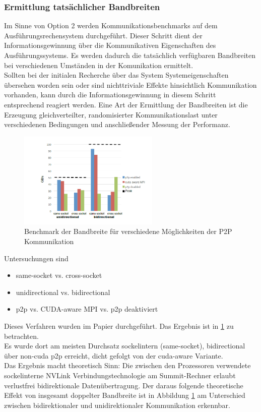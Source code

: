 \subsubsection{Ermittlung tatsächlicher Bandbreiten}
Im Sinne von Option 2 werden Kommunikationsbenchmarks auf dem Ausführungsrechensystem durchgeführt. Dieser Schritt dient der Informationsgewinnung über die Kommunikativen Eigenschaften des Ausführungssystems. Es werden dadurch die tatsächlich verfügbaren Bandbreiten bei verschiedenen Umständen in der Komunikation ermittelt.\\
Sollten bei der initialen Recherche über das System Systemeigenschaften übersehen worden sein oder sind nichttriviale Effekte hinsichtlich Kommunikation vorhanden, kann durch die Informationsgewinnung in diesem Schritt entsprechend reagiert werden.
Eine Art der Ermittlung der Bandbreiten ist die Erzeugung gleichverteilter, randomisierter Kommunikationslast unter verschiedenen Bedingungen und anschließender Messung der Performanz.\\
\begin{figure}
\centering
\includegraphics[width=0.6\textwidth]{res/bench0.png}
\caption{\cite[Abb. 4]{mainpaper} Benchmark der Bandbreite für verschiedene Möglichkeiten der P2P Kommunikation}
	\label{fig:bench0}
\end{figure}
Untersuchungen sind
\begin{itemize}
	\item same-socket vs. cross-socket
	\item unidirectional vs. bidirectional
	\item p2p vs. CUDA-aware MPI vs. p2p deaktiviert
\end{itemize}
Dieses Verfahren wurden im Papier \cite{mainpaper} durchgeführt. Das Ergebnis ist in \ref{fig:bench0} zu betrachten.\\
Es wurde dort am meisten Durchsatz sockelintern (same-socket), bidirectional über non-cuda p2p erreicht, dicht gefolgt von der cuda-aware Variante.\\
Das Ergebnis macht theoretisch Sinn: Die zwischen den Prozessoren verwendete sockelinterne NVLink Verbindungstechnologie am Summit-Rechner erlaubt verlustfrei bidirektionale Datenübertragung. Der daraus folgende theoretische Effekt von insgesamt doppelter Bandbreite ist in Abbildung \ref{fig:bench0} am Unterschied zwischen bidirektionaler und unidirektionaler Kommunikation erkennbar.\\

